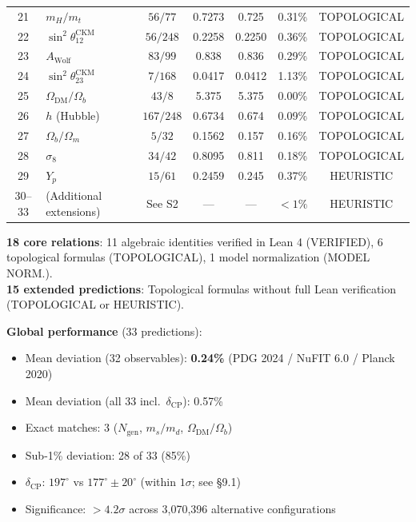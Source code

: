 \documentclass[11pt,a4paper]{article}
\begin{document}
\begin{table}[H]
\begin{tabular}{clccccc}
21 & $m_H/m_t$ & $56/77$ & 0.7273 & 0.725 & 0.31\% & TOPOLOGICAL \\
22 & $\sin^2\theta_{12}^{\mathrm{CKM}}$ & $56/248$ & 0.2258 & 0.2250 & 0.36\% & TOPOLOGICAL \\
23 & $A_{\mathrm{Wolf}}$ & $83/99$ & 0.838 & 0.836 & 0.29\% & TOPOLOGICAL \\
24 & $\sin^2\theta_{23}^{\mathrm{CKM}}$ & $7/168$ & 0.0417 & 0.0412 & 1.13\% & TOPOLOGICAL \\
25 & $\Omega_{\mathrm{DM}}/\Omega_b$ & $43/8$ & 5.375 & 5.375 & 0.00\% & TOPOLOGICAL \\
26 & $h$ (Hubble) & $167/248$ & 0.6734 & 0.674 & 0.09\% & TOPOLOGICAL \\
27 & $\Omega_b/\Omega_m$ & $5/32$ & 0.1562 & 0.157 & 0.16\% & TOPOLOGICAL \\
28 & $\sigma_8$ & $34/42$ & 0.8095 & 0.811 & 0.18\% & TOPOLOGICAL \\
29 & $Y_p$ & $15/61$ & 0.2459 & 0.245 & 0.37\% & HEURISTIC \\
30--33 & (Additional extensions) & See S2 & --- & --- & $<1\%$ & HEURISTIC \\
\bottomrule
\end{tabular}
\end{table}

\textbf{18 core relations}: 11 algebraic identities verified in Lean 4 (VERIFIED), 6 topological formulas (TOPOLOGICAL), 1 model normalization (MODEL NORM.).\\
\textbf{15 extended predictions}: Topological formulas without full Lean verification (TOPOLOGICAL or HEURISTIC).

\textbf{Global performance} (33 predictions):
\begin{itemize}
\item Mean deviation (32 observables): \textbf{0.24\%} (PDG 2024 / NuFIT 6.0 / Planck 2020)
\item Mean deviation (all 33 incl.\ $\delta_{\mathrm{CP}}$): 0.57\%
\item Exact matches: 3 ($N_{\mathrm{gen}}$, $m_s/m_d$, $\Omega_{\mathrm{DM}}/\Omega_b$)
\item Sub-1\% deviation: 28 of 33 (85\%)
\item $\delta_{\mathrm{CP}}$: $197^\circ$ vs $177^\circ \pm 20^\circ$ (within $1\sigma$; see \S9.1)
\item Significance: $> 4.2\sigma$ across 3,070,396 alternative configurations
\end{itemize}
\end{document}
